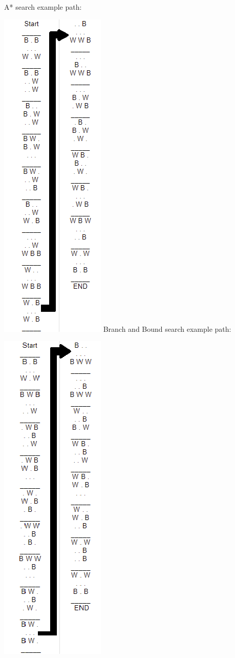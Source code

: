 \documentclass[12pt, letterpaper, final, onecolumn, titlepage] {article}
\begin{document}
\newpage
\begin{multicols}{2}
\noindent A* search example path:

\includegraphics[scale=1]{AStarPath.png}
\vfill\null
\noindent Branch and Bound search example path:

\includegraphics[scale=1]{bnbPath.png}
\end{multicols}
\newpage
\end{document}
